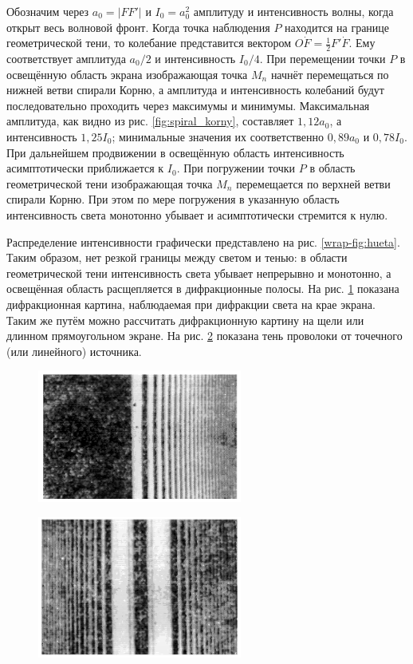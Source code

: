 \documentclass[a4paper,14pt]{article}
\begin{document}
Обозначим через \( a_0 = |F F'| \) и \( I_0 = a_0^2 \) амплитуду и интенсивность волны, когда открыт весь волновой фронт. Когда точка наблюдения \( P \) находится на границе геометрической тени, то колебание представится вектором \( O \dot{F} = \frac{1}{2} F' \dot{F} \). Ему соответствует амплитуда \( a_0/2 \) и интенсивность \( I_0/4 \). При перемещении точки \( P \) в освещённую область экрана изображающая точка \( M_n \) начнёт перемещаться по нижней ветви спирали Корню, а амплитуда и интенсивность колебаний будут последовательно проходить через максимумы и минимумы. Максимальная амплитуда, как видно из рис. \ref{fig:spiral_korny}, составляет \( 1,\!12a_0 \), а интенсивность \( 1,\!25I_0 \); минимальные значения их соответственно \( 0,\!89a_0 \) и \( 0,\!78I_0 \). При дальнейшем продвижении в освещённую область интенсивность асимптотически приближается к \( I_0 \). При погружении точки \( P \) в область геометрической тени изображающая точка \( M_n \) перемещается по верхней ветви спирали Корню. При этом по мере погружения в указанную область интенсивность света монотонно убывает и асимптотически стремится к нулю.

Распределение интенсивности графически представлено на рис. \ref{wrap-fig:hueta}. Таким образом, нет резкой границы между светом и тенью: в области геометрической тени интенсивность света убывает непрерывно и монотонно, а освещённая область расщепляется в дифракционные полосы. На рис. \ref{fig:168} показана дифракционная картина, наблюдаемая при дифракции света на крае экрана. Таким же путём можно рассчитать дифракционную картину на щели или длинном прямоугольном экране. На рис. \ref{fig:169} показана тень проволоки от точечного (или линейного) источника.

\begin{figure}[h]
    \centering
    \includegraphics[width = 0.6\textwidth]{168.png}
    \caption{}\label{fig:168}
\end{figure}

\begin{figure}[h]
    \centering
    \includegraphics[width = 0.6\textwidth]{169.png}
    \caption{}\label{fig:169}
\end{figure}
\end{document}
